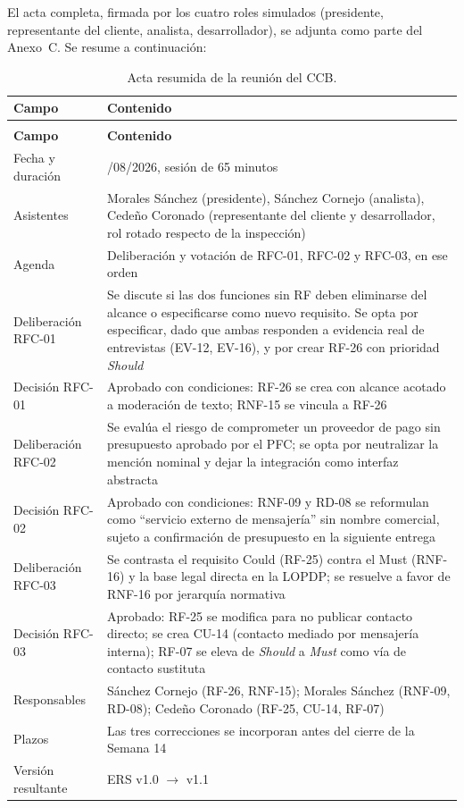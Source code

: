 \documentclass[journal,onecolumn]{IEEEtran}
\makeatletter
\newenvironment{atributos}[2]{%
	\small
	\begin{longtable}{@{}>{\raggedright\arraybackslash}p{4.2cm} >{\raggedright\arraybackslash}p{11.2cm}@{}}
		\caption{#2}\label{tab:#1}\\
		\toprule
		\textbf{Campo} & \textbf{Contenido} \\
		\midrule
		\endfirsthead
		\multicolumn{2}{@{}l}{\small\itshape (continuación)}\\
		\toprule
		\textbf{Campo} & \textbf{Contenido} \\
		\midrule
		\endhead
		\bottomrule
		\endlastfoot
	}{%
	\end{longtable}
	\normalsize
}
\makeatother
\begin{document}
	El acta completa, firmada por los cuatro roles simulados
	(presidente, representante del cliente, analista, desarrollador),
	se adjunta como parte del Anexo~C. Se resume a continuación:
	
	\begin{atributos}{acta-ccb}{Acta resumida de la reunión del CCB.}
		Fecha y duración & 09/08/2026, sesión de 65 minutos \\
		Asistentes & Morales Sánchez (presidente), Sánchez Cornejo (analista), Cedeño Coronado (representante del cliente y desarrollador, rol rotado respecto de la inspección) \\
		Agenda & Deliberación y votación de RFC-01, RFC-02 y RFC-03, en ese orden \\
		Deliberación RFC-01 & Se discute si las dos funciones sin RF deben eliminarse del alcance o especificarse como nuevo requisito. Se opta por especificar, dado que ambas responden a evidencia real de entrevistas (EV-12, EV-16), y por crear RF-26 con prioridad \emph{Should} \\
		Decisión RFC-01 & Aprobado con condiciones: RF-26 se crea con alcance acotado a moderación de texto; RNF-15 se vincula a RF-26 \\
		Deliberación RFC-02 & Se evalúa el riesgo de comprometer un proveedor de pago sin presupuesto aprobado por el PFC; se opta por neutralizar la mención nominal y dejar la integración como interfaz abstracta \\
		Decisión RFC-02 & Aprobado con condiciones: RNF-09 y RD-08 se reformulan como ``servicio externo de mensajería'' sin nombre comercial, sujeto a confirmación de presupuesto en la siguiente entrega \\
		Deliberación RFC-03 & Se contrasta el requisito Could (RF-25) contra el Must (RNF-16) y la base legal directa en la LOPDP; se resuelve a favor de RNF-16 por jerarquía normativa \\
		Decisión RFC-03 & Aprobado: RF-25 se modifica para no publicar contacto directo; se crea CU-14 (contacto mediado por mensajería interna); RF-07 se eleva de \emph{Should} a \emph{Must} como vía de contacto sustituta \\
		Responsables & Sánchez Cornejo (RF-26, RNF-15); Morales Sánchez (RNF-09, RD-08); Cedeño Coronado (RF-25, CU-14, RF-07) \\
		Plazos & Las tres correcciones se incorporan antes del cierre de la Semana 14 \\
		Versión resultante & ERS v1.0 $\rightarrow$ v1.1 \\
	\end{atributos}
	
\end{document}
